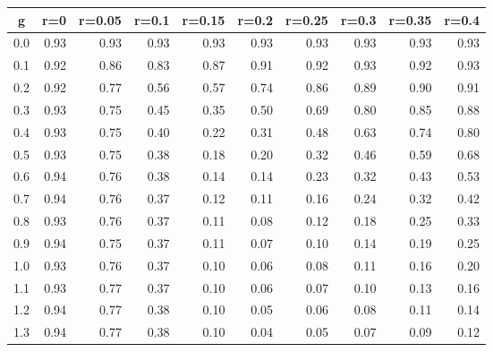 %
\begin{table}[!tbp]
 \begin{center}
 \begin{tabular}{rrrrrrrrrr}\hline\hline
\multicolumn{1}{c}{g}&\multicolumn{1}{c}{r=0}&\multicolumn{1}{c}{r=0.05}&\multicolumn{1}{c}{r=0.1}&\multicolumn{1}{c}{r=0.15}&\multicolumn{1}{c}{r=0.2}&\multicolumn{1}{c}{r=0.25}&\multicolumn{1}{c}{r=0.3}&\multicolumn{1}{c}{r=0.35}&\multicolumn{1}{c}{r=0.4}\tabularnewline
\hline
0.0&0.93&0.93&0.93&0.93&0.93&0.93&0.93&0.93&0.93\tabularnewline
0.1&0.92&0.86&0.83&0.87&0.91&0.92&0.93&0.92&0.93\tabularnewline
0.2&0.92&0.77&0.56&0.57&0.74&0.86&0.89&0.90&0.91\tabularnewline
0.3&0.93&0.75&0.45&0.35&0.50&0.69&0.80&0.85&0.88\tabularnewline
0.4&0.93&0.75&0.40&0.22&0.31&0.48&0.63&0.74&0.80\tabularnewline
0.5&0.93&0.75&0.38&0.18&0.20&0.32&0.46&0.59&0.68\tabularnewline
0.6&0.94&0.76&0.38&0.14&0.14&0.23&0.32&0.43&0.53\tabularnewline
0.7&0.94&0.76&0.37&0.12&0.11&0.16&0.24&0.32&0.42\tabularnewline
0.8&0.93&0.76&0.37&0.11&0.08&0.12&0.18&0.25&0.33\tabularnewline
0.9&0.94&0.75&0.37&0.11&0.07&0.10&0.14&0.19&0.25\tabularnewline
1.0&0.93&0.76&0.37&0.10&0.06&0.08&0.11&0.16&0.20\tabularnewline
1.1&0.93&0.77&0.37&0.10&0.06&0.07&0.10&0.13&0.16\tabularnewline
1.2&0.94&0.77&0.38&0.10&0.05&0.06&0.08&0.11&0.14\tabularnewline
1.3&0.94&0.77&0.38&0.10&0.04&0.05&0.07&0.09&0.12\tabularnewline
\hline
\end{tabular}

\end{center}

\end{table}

